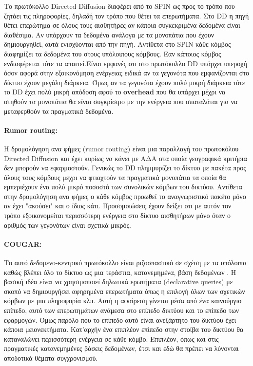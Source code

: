 Το πρωτόκολλο Directed Diffusion διαφέρει από το SPIN ως προς το τρόπο που ζητάει τις πληροφορίες, δηλαδή τον τρόπο που θέτει τα επερωτήματα. Στο DD η πηγή θέτει
επερώτημα σε όλους τους αισθητήρες αν κάποια συγκεκριμένα δεδομένα είναι διαθέσιμα. Αν υπάρχουν τα δεδομένα ανάλογα με τα μονοπάτια που έχουν δημιουργηθεί, αυτά
ενισχύονται από την πηγή. Αντίθετα στο SPIN κάθε κόμβος διαφημίζει τα δεδομένα του στους υπόλοιπους κόμβους. Εαν κάποιος κόμβος ενδιαφέρεται τότε τα απαιτεί.Είναι
εμφανές οτι στο πρωτόκολλο DD υπάρχει υπεροχή όσον αφορά στην εξοικονόμηση ενέργειας ειδικά αν τα γεγονότα που εμφανίζονται στο δίκτυο έχουν μεγάλη διάρκεια. Όμως αν
τα γεγονότα έχουν πολύ μικρή διάρκεια τότε το DD έχει πολύ μικρή απόδοση αφού το \textbf{overhead} που θα υπάρχει μέχρι να στηθούν τα μονοπάτια θα είναι συγκρίσιμο με
την ενέργεια που σπαταλάται για να μεταφερθούν τα πραγματικά δεδομένα.

\paragraph{Rumor routing:} Η δρομολόγηση ανα φήμες (rumor routing) \cite{rumor_routing} είναι μια παραλλαγή του πρωτοκόλου Directed Diffusion και έχει κυρίως να κάνει
με ΑΔΑ στα οποία γεογραφικά κριτήρια δεν μπορούν να εφαρμοστούν. Γενικώς το DD πλημμυρίζει το δίκτυο με πακέτα προς όλους τους κόμβους μεχρι να φτιαχτούν τα
πραγματικά μονοπάτια τα οποία θα εμπεριέχουν ένα πολύ μικρό ποσοστό των συνολικών κόμβων του δικτύου. Αντίθετα στην δρομολόγηση ανα φήμες ο κάθε κόμβος προωθεί το
αναγνωριστικό πακέτο μόνο αν έχει "ακούσει" και ο ίδιος κάτι. Προσομοιώσεις έχουν δείξει οτι με αυτόν τον τρόπο εξοικονομείται περισσότερη ενέργεια στο δίκτυο
αισθητήρων μόνο όταν ο αριθμός των γεγονότων είναι σχετικά μικρός.

\paragraph{COUGAR:} Το αυτό δεδομενο-κεντρικό πρωτόκολλο είναι ριζοσπαστικό σε σχέση με τα υπόλοιπα καθώς βλέπει όλο το δίκτυο ως μια τεράστια, κατανεμημένα, βάση
δεδομένων \cite{cougar_protocol}. Η βασική ιδέα είναι να χρησιμοποιεί δηλωτικά ερωτήματα (declarative queries) με σκοπό να δημιουργήσει αφηρημένα επερωτήματα όπως η
επιλογή όλων των σχετικών κόμβων με μια πληροφορία κλπ. Αυτή η αφαίρεση γίνεται μέσα από ένα καινούργιο επίπεδο, αυτό των επερωτημάτων ανάμεσα στο επίπεδο δικτύου και
το επίπεδο των εφαρμογών. Όμως παρόλο που το επίπεδο αυτό είναι ανεξάρτητο του δικτύου έχει κάποια μειονεκτήματα. Κατ'αρχήν ένα επιπλέον επίπεδο στην στοίβα του
δικτύου θα καταναλώνει περισσότερη ενέργεια σε κάθε κόμβο. Επιπλέον, όπως και στις πραγματικές κατανεμημένες βάσεις δεδομένων, έτσι και εδώ θα πρέπει να λύνονται
αποδοτικά θέματα συγχρονισμού.

